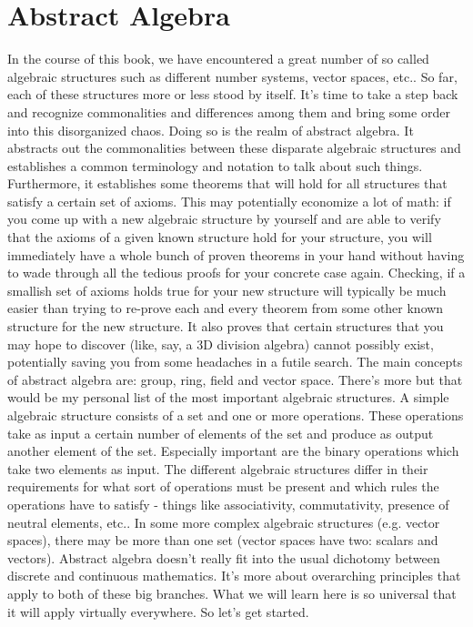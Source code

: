 \chapter{Abstract Algebra}
In the course of this book, we have encountered a great number of so called algebraic structures such as different number systems, vector spaces, etc.. So far, each of these structures more or less stood by itself. It's time to take a step back and recognize commonalities and differences among them and bring some order into this disorganized chaos. Doing so is the realm of abstract algebra. It abstracts out the commonalities between these disparate algebraic structures and establishes a common terminology and notation to talk about such things. Furthermore, it establishes some theorems that will hold for all structures that satisfy a certain set of axioms. This may potentially economize a lot of math: if you come up with a new algebraic structure by yourself and are able to verify that the axioms of a given known structure hold for your structure, you will immediately have a whole bunch of proven theorems in your hand without having to wade through all the tedious proofs for your concrete case again. Checking, if a smallish set of axioms holds true for your new structure will typically be much easier than trying to re-prove each and every theorem from some other known structure for the new structure. It also proves that certain structures that you may hope to discover (like, say, a 3D division algebra) cannot possibly exist, potentially saving you from some headaches in a futile search. The main concepts of abstract algebra are: group, ring, field and vector space. There's more but that would be my personal list of the most important algebraic structures. A simple algebraic structure consists of a set and one or more operations. These operations take as input a certain number of elements of the set and produce as output another element of the set. Especially important are the binary operations which take two elements as input. The different algebraic structures differ in their requirements for what sort of operations must be present and which rules the operations have to satisfy - things like associativity, commutativity, presence of neutral elements, etc.. In some more complex algebraic structures (e.g. vector spaces), there may be more than one set (vector spaces have two: scalars and vectors). Abstract algebra doesn't really fit into the usual dichotomy between discrete and continuous mathematics. It's more about overarching principles that apply to both of these big branches. What we will learn here is so universal that it will apply virtually everywhere. So let's get started.


